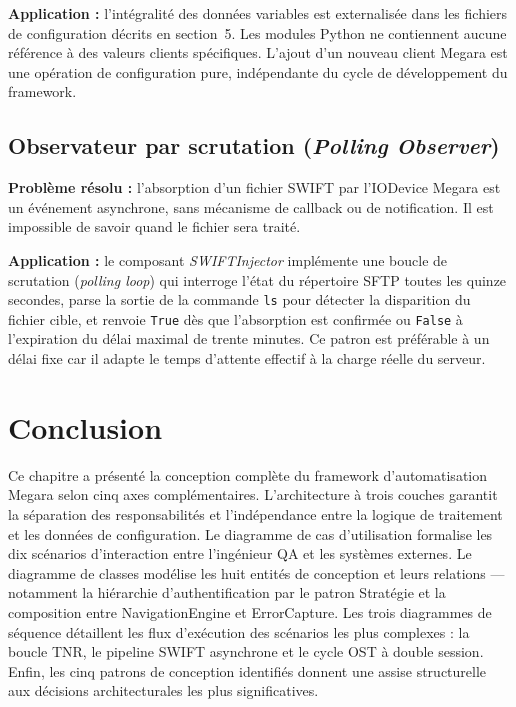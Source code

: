 \documentclass[12pt, a4paper]{report}
\begin{document}
\textbf{Application :} l'intégralité des données variables est externalisée dans les fichiers de configuration décrits en section~5. Les modules Python ne contiennent aucune référence à des valeurs clients spécifiques. L'ajout d'un nouveau client Megara est une opération de configuration pure, indépendante du cycle de développement du framework.

\subsection{Observateur par scrutation (\textit{Polling Observer})}

\textbf{Problème résolu :} l'absorption d'un fichier SWIFT par l'IODevice Megara est un événement asynchrone, sans mécanisme de callback ou de notification. Il est impossible de savoir quand le fichier sera traité.

\textbf{Application :} le composant \textit{SWIFTInjector} implémente une boucle de scrutation (\textit{polling loop}) qui interroge l'état du répertoire SFTP toutes les quinze secondes, parse la sortie de la commande \texttt{ls} pour détecter la disparition du fichier cible, et renvoie \texttt{True} dès que l'absorption est confirmée ou \texttt{False} à l'expiration du délai maximal de trente minutes. Ce patron est préférable à un délai fixe car il adapte le temps d'attente effectif à la charge réelle du serveur.

\section*{Conclusion}

Ce chapitre a présenté la conception complète du framework d'automatisation Megara selon cinq axes complémentaires. L'architecture à trois couches garantit la séparation des responsabilités et l'indépendance entre la logique de traitement et les données de configuration. Le diagramme de cas d'utilisation formalise les dix scénarios d'interaction entre l'ingénieur QA et les systèmes externes. Le diagramme de classes modélise les huit entités de conception et leurs relations — notamment la hiérarchie d'authentification par le patron Stratégie et la composition entre NavigationEngine et ErrorCapture. Les trois diagrammes de séquence détaillent les flux d'exécution des scénarios les plus complexes : la boucle TNR, le pipeline SWIFT asynchrone et le cycle OST à double session. Enfin, les cinq patrons de conception identifiés donnent une assise structurelle aux décisions architecturales les plus significatives.
\end{document}
